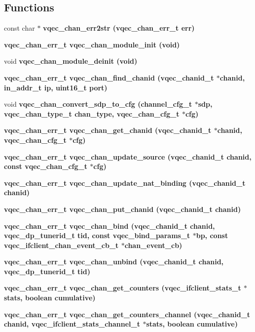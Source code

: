\subsection*{Functions}
\begin{CompactItemize}
\item 
const char $\ast$ \bf{vqec\_\-chan\_\-err2str} (\bf{vqec\_\-chan\_\-err\_\-t} err)
\item 
\bf{vqec\_\-chan\_\-err\_\-t} \bf{vqec\_\-chan\_\-module\_\-init} (void)
\item 
void \bf{vqec\_\-chan\_\-module\_\-deinit} (void)
\item 
\bf{vqec\_\-chan\_\-err\_\-t} \bf{vqec\_\-chan\_\-find\_\-chanid} (\bf{vqec\_\-chanid\_\-t} $\ast$chanid, in\_\-addr\_\-t ip, uint16\_\-t port)
\item 
void \bf{vqec\_\-chan\_\-convert\_\-sdp\_\-to\_\-cfg} (channel\_\-cfg\_\-t $\ast$sdp, \bf{vqec\_\-chan\_\-type\_\-t} chan\_\-type, \bf{vqec\_\-chan\_\-cfg\_\-t} $\ast$cfg)
\item 
\bf{vqec\_\-chan\_\-err\_\-t} \bf{vqec\_\-chan\_\-get\_\-chanid} (\bf{vqec\_\-chanid\_\-t} $\ast$chanid, \bf{vqec\_\-chan\_\-cfg\_\-t} $\ast$cfg)
\item 
\bf{vqec\_\-chan\_\-err\_\-t} \bf{vqec\_\-chan\_\-update\_\-source} (\bf{vqec\_\-chanid\_\-t} chanid, const \bf{vqec\_\-chan\_\-cfg\_\-t} $\ast$cfg)
\item 
\bf{vqec\_\-chan\_\-err\_\-t} \bf{vqec\_\-chan\_\-update\_\-nat\_\-binding} (\bf{vqec\_\-chanid\_\-t} chanid)
\item 
\bf{vqec\_\-chan\_\-err\_\-t} \bf{vqec\_\-chan\_\-put\_\-chanid} (\bf{vqec\_\-chanid\_\-t} chanid)
\item 
\bf{vqec\_\-chan\_\-err\_\-t} \bf{vqec\_\-chan\_\-bind} (\bf{vqec\_\-chanid\_\-t} chanid, vqec\_\-dp\_\-tunerid\_\-t tid, const \bf{vqec\_\-bind\_\-params\_\-t} $\ast$bp, const \bf{vqec\_\-ifclient\_\-chan\_\-event\_\-cb\_\-t} $\ast$chan\_\-event\_\-cb)
\item 
\bf{vqec\_\-chan\_\-err\_\-t} \bf{vqec\_\-chan\_\-unbind} (\bf{vqec\_\-chanid\_\-t} chanid, vqec\_\-dp\_\-tunerid\_\-t tid)
\item 
\bf{vqec\_\-chan\_\-err\_\-t} \bf{vqec\_\-chan\_\-get\_\-counters} (\bf{vqec\_\-ifclient\_\-stats\_\-t} $\ast$stats, boolean cumulative)
\item 
\bf{vqec\_\-chan\_\-err\_\-t} \bf{vqec\_\-chan\_\-get\_\-counters\_\-channel} (\bf{vqec\_\-chanid\_\-t} chanid, \bf{vqec\_\-ifclient\_\-stats\_\-channel\_\-t} $\ast$stats, boolean cumulative)
\item 

\end{CompactItemize}

